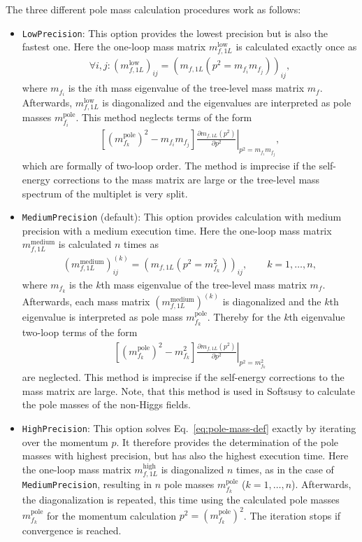 \documentclass[final,3p,11pt,pdflatex]{elsarticle}
\newcommand{\code}[1]{\lstinline|#1|}  %
\newcommand{\pole}{\text{pole}}
\begin{document}
The three different pole mass calculation procedures work as follows:
%
\begin{itemize}
\item \code{LowPrecision}: This option provides the lowest precision
  but is also the fastest one.  Here the one-loop mass matrix
  $m_{f,1L}^\text{low}$ is calculated exactly once as
%
  \begin{align}
    \forall i,j: (m_{f,1L}^\text{low})_{ij} = (m_{f,1L}(p^2 = m_{f_i}
    m_{f_j}))_{ij} ,
  \end{align}
%
  where $m_{f_i}$ is the $i$th mass eigenvalue of the tree-level mass
  matrix $m_f$.  Afterwards, $m_{f,1L}^\text{low}$ is diagonalized and
  the eigenvalues are interpreted as pole masses $m_{f_i}^\pole$.
  This method neglects terms of the form
  \begin{align}
    \left[(m_{f_k}^\pole)^2 - m_{f_i}m_{f_j}\right]
    \left.\frac{\partial m_{f,1L}(p^2)}{\partial
        p^2}\right|_{p^2=m_{f_i}m_{f_j}} ,
  \end{align}
  which are formally of two-loop order.  The method is imprecise if
  the self-energy corrections to the mass matrix are large or the
  tree-level mass spectrum of the multiplet is very split.

\item \code{MediumPrecision} (default): This option
  provides calculation with medium precision with a medium execution
  time.  Here the one-loop mass matrix $m_{f,1L}^\text{medium}$ is
  calculated $n$ times as
%
  \begin{align}
    (m_{f,1L}^\text{medium})_{ij}^{(k)} = (m_{f,1L}(p^2 =
    m_{f_k}^2))_{ij} , \qquad k = 1,\ldots,n ,
  \end{align}
%
  where $m_{f_k}$ is the $k$th mass eigenvalue of the tree-level mass
  matrix $m_f$.  Afterwards, each mass matrix
  $(m_{f,1L}^\text{medium})^{(k)}$ is diagonalized and the $k$th
  eigenvalue is interpreted as pole mass $m_{f_k}^\pole$.  Thereby for
  the $k$th eigenvalue two-loop terms of the form
  \begin{align}
    \left[(m_{f_k}^\pole)^2 - m_{f_k}^2\right] \left.\frac{\partial
        m_{f,1L}(p^2)}{\partial p^2}\right|_{p^2=m_{f_k}^2}
  \end{align}
  are neglected.  This method is imprecise if the self-energy
  corrections to the mass matrix are large.  Note, that this method is
  used in Softsusy to calculate the pole masses of the non-Higgs
  fields.

\item \code{HighPrecision}: This option solves
  Eq.~\eqref{eq:pole-mass-def} exactly by iterating over the momentum
  $p$.  It therefore provides the determination of the pole masses
  with highest precision, but has also the highest execution time.
  Here the one-loop mass matrix $m_{f,1L}^\text{high}$ is diagonalized
  $n$ times, as in the case of \code{MediumPrecision},
  resulting in $n$ pole masses $m_{f_k}^\pole$ ($k = 1,\ldots,n$).
  Afterwards, the diagonalization is repeated, this time using the
  calculated pole masses $m_{f_k}^\pole$ for the momentum calculation
  $p^2 = (m_{f_k}^\pole)^2$.  The iteration stops if convergence is
  reached.
\end{itemize}
\end{document}
